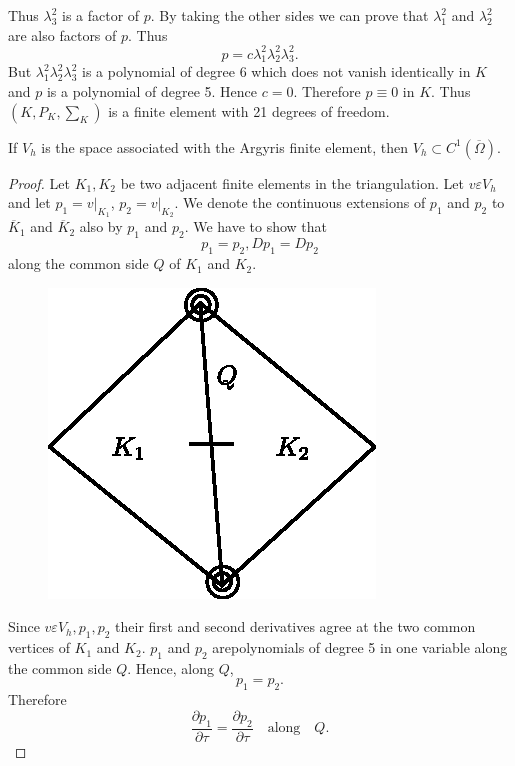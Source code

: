 \begin{exam}
Thus $\lambda_3^2$ is a factor of $p$. By taking the other sides we
can prove that $\lambda_1^2$ and $\lambda_2^2$ are also factors of
$p$. Thus 
$$
p=c\lambda_1^2\lambda_2^2\lambda_3^2.
$$\pageoriginale
But $\lambda_1^2\lambda_2^2\lambda_3^2$ is a polynomial of degree 6
which does not vanish identically in $K$ and $p$ is a polynomial of
degree 5. Hence $c=0$. Therefore $p\equiv 0$ in $K$. Thus $(K, P_K,
\sum_K)$ is a finite element with 21 degrees of freedom.
\end{exam}

\begin{THM}\label{chap3:THM4}
If $V_h$ is the space associated with the Argyris finite element, then
$V_h\subset C^1(\overline{\Omega})$.
\end{THM}

\begin{proof}
Let $K_1, K_2$ be two adjacent finite elements in the
triangulation. Let $v\varepsilon V_h$ and let $p_1=v|_{K_1}$,
$p_2=v|_{K_2}$. We denote the continuous extensions of $p_1$ and $p_2$
to $\overline{K}_1$ and $\overline{K}_2$ also by $p_1$ and $p_2$. We
have to show that 
$$
p_1=p_2, Dp_1=Dp_2
$$
along the common side $Q$ of $K_1$ and $K_2$. 
\begin{figure}[H]
\centering
\includegraphics{figure/fig3.11.eps}
\caption{}\label{fig3.11}
\end{figure}

Since $v\varepsilon V_h, p_1, p_2$ their first and second derivatives
agree at the two common vertices of $K_1$ and $K_2$. $p_1$ and $p_2$
are\pageoriginale polynomials of degree 5 in one variable along the
common side $Q$. Hence, along $Q$, 
\begin{equation}\label{chap3:eq3.14}
p_1=p_2.
\end{equation}
Therefore 
\begin{equation}\label{chap3:eq3.15}
\frac{\partial p_1}{\partial\tau}=\frac{\partial p_2}{\partial\tau}
\quad\text{along}\quad Q.
\end{equation}


\end{proof}
